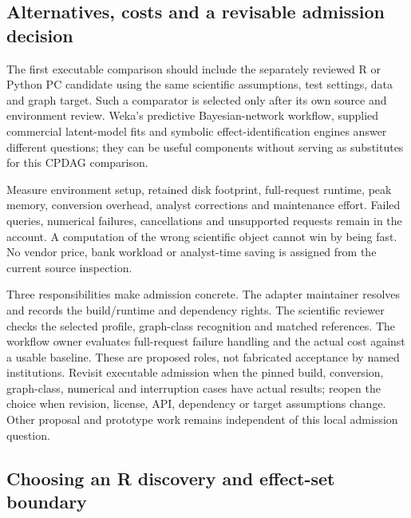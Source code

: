 \hypertarget{alternatives-costs-and-a-revisable-admission-decision}{%
\subsection{Alternatives, costs and a revisable admission
decision}\label{alternatives-costs-and-a-revisable-admission-decision}}

The first executable comparison should include the separately reviewed R
or Python PC candidate using the same scientific assumptions, test
settings, data and graph target. Such a comparator is selected only
after its own source and environment review. Weka's predictive
Bayesian-network workflow, supplied commercial latent-model fits and
symbolic effect-identification engines answer different questions; they
can be useful components without serving as substitutes for this CPDAG
comparison. \citep{exec13_java_tetrad,exec13_tetrad_reuse_decision}

Measure environment setup, retained disk footprint, full-request
runtime, peak memory, conversion overhead, analyst corrections and
maintenance effort. Failed queries, numerical failures, cancellations
and unsupported requests remain in the account. A computation of the
wrong scientific object cannot win by being fast. No vendor price, bank
workload or analyst-time saving is assigned from the current source
inspection.

Three responsibilities make admission concrete. The adapter maintainer
resolves and records the build/runtime and dependency rights. The
scientific reviewer checks the selected profile, graph-class recognition
and matched references. The workflow owner evaluates full-request
failure handling and the actual cost against a usable baseline. These
are proposed roles, not fabricated acceptance by named institutions.
Revisit executable admission when the pinned build, conversion,
graph-class, numerical and interruption cases have actual results;
reopen the choice when revision, license, API, dependency or target
assumptions change. Other proposal and prototype work remains
independent of this local admission question.
\citep{exec13_tetrad_reuse_decision} \label{exec13:tetrad-reuse-end}


\hypertarget{choosing-an-r-discovery-and-effect-set-boundary}{%
\subsection{Choosing an R discovery and effect-set
boundary}\label{choosing-an-r-discovery-and-effect-set-boundary}}

